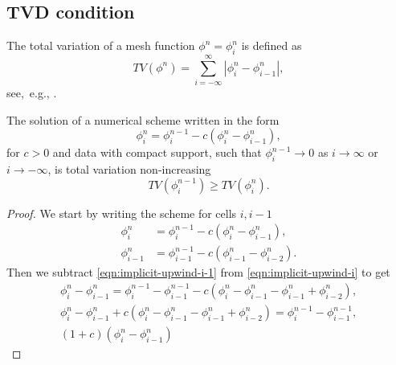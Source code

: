 \documentclass[../thesis.tex]{subfiles}
\begin{document}
\subsection{TVD condition}
The total variation of a mesh function \(\phi^{n} = {\phi_{i}^{n}}\) is defined
as
\begin{equation}
    TV(\phi^{n}) =
    \sum_{i = -\infty}^{\infty}|\phi_{i}^{n} - \phi_{i-1}^{n}|,
\end{equation}
see,~e.g., \cite{1977_VanLeer,1983_Harten,1984_Sweby,1985_Yee,1990_Hirsch_BOOK,1992_LeVeque_BOOK,1996_Jasak,1998_Laney_BOOK,2000_Hoffmann,2002_LeVeque_BOOK,2007_Hirsch_BOOK}.
\begin{theorem}
The solution of a numerical scheme written in the form
\begin{equation}\label{eqn:implicit-upwind-1d-tvd-proof}
    \phi_{i}^{n} =
    \phi_{i}^{n-1} - c\left( \phi_{i}^{n} - \phi_{i-1}^{n} \right),
\end{equation}
for \(c > 0\) and data with compact support,
such that \(\phi_{i}^{n-1} \rightarrow 0 \) as \(i \rightarrow \infty\)
or \(i \rightarrow -\infty\), is total variation non-increasing
\begin{equation}\label{eqn:tvd-condition}
    TV(\phi_{i}^{n-1}) \geq TV(\phi_{i}^{n}).
\end{equation}
\begin{proof}
We start by writing the scheme for cells \(i,i-1\)
    \begin{align}
        \phi_{i}^{n} &=
        \phi_{i}^{n-1} - c\left( \phi_{i}^{n} - \phi_{i-1}^{n} \right),
        \label{eqn:implicit-upwind-i}
        \\
        \phi_{i-1}^{n} &=
        \phi_{i-1}^{n-1} - c\left( \phi_{i-1}^{n} - \phi_{i-2}^{n} \right)
        \label{eqn:implicit-upwind-i-1}.
    \end{align}
Then we subtract \eqref{eqn:implicit-upwind-i-1} from \eqref{eqn:implicit-upwind-i}
to get
\begin{equation}
    \begin{split}
        \phi_{i}^{n} - \phi_{i-1}^{n} =
        \phi_{i}^{n-1} - \phi_{i-1}^{n-1}
        - c\left( \phi_{i}^{n} - \phi_{i-1}^{n}
        - \phi_{i-1}^{n} + \phi_{i-2}^{n} \right),
        \\
        \phi_{i}^{n} - \phi_{i-1}^{n} + c\left( \phi_{i}^{n} - \phi_{i-1}^{n}
        - \phi_{i-1}^{n} + \phi_{i-2}^{n} \right)
        =
        \phi_{i}^{n-1} - \phi_{i-1}^{n-1},
        \\
        (1+c)\left( \phi_{i}^{n} - \phi_{i-1}^{n} \right)

\end{split}
\end{equation}
\end{proof}
\end{theorem}
\end{document}
